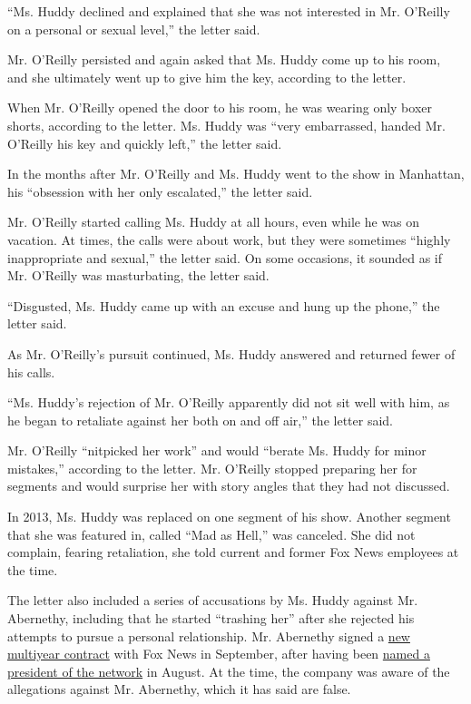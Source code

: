 ``Ms. Huddy declined and explained that she was not interested in Mr.
O'Reilly on a personal or sexual level,'' the letter said.

Mr. O'Reilly persisted and again asked that Ms. Huddy come up to his
room, and she ultimately went up to give him the key, according to the
letter.

When Mr. O'Reilly opened the door to his room, he was wearing only boxer
shorts, according to the letter. Ms. Huddy was ``very embarrassed,
handed Mr. O'Reilly his key and quickly left,'' the letter said.

In the months after Mr. O'Reilly and Ms. Huddy went to the show in
Manhattan, his ``obsession with her only escalated,'' the letter said.

Mr. O'Reilly started calling Ms. Huddy at all hours, even while he was
on vacation. At times, the calls were about work, but they were
sometimes ``highly inappropriate and sexual,'' the letter said. On some
occasions, it sounded as if Mr. O'Reilly was masturbating, the letter
said.

``Disgusted, Ms. Huddy came up with an excuse and hung up the phone,''
the letter said.

As Mr. O'Reilly's pursuit continued, Ms. Huddy answered and returned
fewer of his calls.

``Ms. Huddy's rejection of Mr. O'Reilly apparently did not sit well with
him, as he began to retaliate against her both on and off air,'' the
letter said.

Mr. O'Reilly ``nitpicked her work'' and would ``berate Ms. Huddy for
minor mistakes,'' according to the letter. Mr. O'Reilly stopped
preparing her for segments and would surprise her with story angles that
they had not discussed.

In 2013, Ms. Huddy was replaced on one segment of his show. Another
segment that she was featured in, called ``Mad as Hell,'' was canceled.
She did not complain, fearing retaliation, she told current and former
Fox News employees at the time.

The letter also included a series of accusations by Ms. Huddy against
Mr. Abernethy, including that he started ``trashing her'' after she
rejected his attempts to pursue a personal relationship. Mr. Abernethy
signed a
\href{http://press.foxnews.com/2016/09/fox-news-co-presidents-jack-abernethy-and-bill-shine-sign-new-multi-year-contracts/}{new
multiyear contract} with Fox News in September, after having been
\href{http://www.nytimes3xbfgragh.onion/2016/09/15/business/media/fox-co-presidents-bill-shine-jack-abernethy-sign-contracts.html}{named
a president of the network} in August. At the time, the company was
aware of the allegations against Mr. Abernethy, which it has said are
false.

